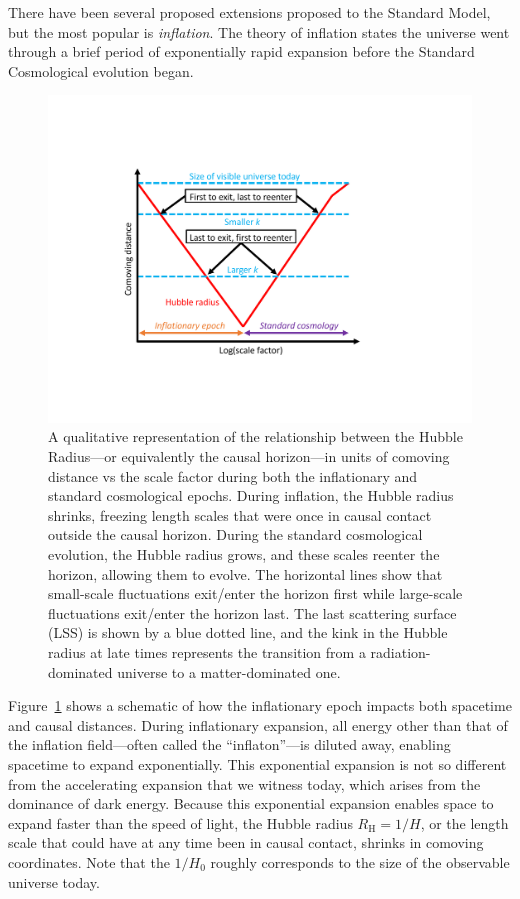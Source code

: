 There have been several proposed extensions proposed to the Standard Model, but the most popular is \textit{inflation}. The theory of inflation states the universe went through a brief period of exponentially rapid expansion before the Standard Cosmological evolution began.

\begin{figure}[!t]
    \centering
    \includegraphics[width=0.6\linewidth, trim=5cm 4cm 7cm 4cm, clip]{ScientificMotivation/Figures/mode_exit_enter.pdf}
    \caption[A figure of mode exit and reentry in in the inflationary paradigm]{A qualitative representation of the relationship between the Hubble Radius---or equivalently the causal horizon---in units of comoving distance vs the scale factor during both the inflationary and standard cosmological epochs. During inflation, the Hubble radius shrinks, freezing length scales that were once in causal contact outside the causal horizon. During the standard cosmological evolution, the Hubble radius grows, and these scales reenter the horizon, allowing them to evolve. The horizontal lines show that small-scale fluctuations exit/enter the horizon first while large-scale fluctuations exit/enter the horizon last. The last scattering surface (LSS) is shown by a blue dotted line, and the kink in the Hubble radius at late times represents the transition from a radiation-dominated universe to a matter-dominated one.}
    \label{fig:mode_entry}
\end{figure}

Figure~\ref{fig:mode_entry} shows a schematic of how the inflationary epoch impacts both spacetime and causal distances. During inflationary expansion, all energy other than that of the inflation field---often called the ``inflaton''---is diluted away, enabling spacetime to expand exponentially.  This exponential expansion is not so different from the accelerating expansion that we witness today, which arises from the dominance of dark energy. Because this exponential expansion enables space to expand faster than the speed of light, the Hubble radius $R_{\mathrm{H}} = 1 / H$, or the length scale that could have at any time been in causal contact, shrinks in comoving coordinates. Note that the $1 / H_{0}$ roughly corresponds to the size of the observable universe today.

